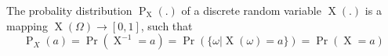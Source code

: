 The probality distribution $\operatorname{P}_{\operatorname{X}}(.)$ of a discrete random variable $\operatorname{X}(.)$ is a mapping $\operatorname{X}(\Omega) \to [0, 1]$, such that
$$\operatorname{P}_X(a) = \operatorname{Pr}(\operatorname{X}^{-1} = a) =  \operatorname{Pr}(\{\omega | \operatorname{X}(\omega) = a\}) = \operatorname{Pr}(\operatorname{X} = a)$$
